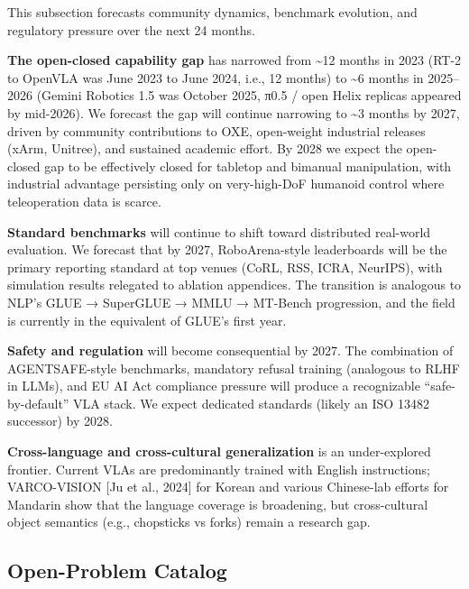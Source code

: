 \documentclass{article}
\begin{document}
This subsection forecasts community dynamics, benchmark evolution, and regulatory pressure over the next 24 months.

\textbf{The open-closed capability gap} has narrowed from \textasciitilde12 months in 2023 (RT-2 to OpenVLA was June 2023 to June 2024, i.e., 12 months) to \textasciitilde6 months in 2025--2026 (Gemini Robotics 1.5 was October 2025, π0.5 / open Helix replicas appeared by mid-2026). We forecast the gap will continue narrowing to \textasciitilde3 months by 2027, driven by community contributions to OXE, open-weight industrial releases (xArm, Unitree), and sustained academic effort. By 2028 we expect the open-closed gap to be effectively closed for tabletop and bimanual manipulation, with industrial advantage persisting only on very-high-DoF humanoid control where teleoperation data is scarce.

\textbf{Standard benchmarks} will continue to shift toward distributed real-world evaluation. We forecast that by 2027, RoboArena-style leaderboards will be the primary reporting standard at top venues (CoRL, RSS, ICRA, NeurIPS), with simulation results relegated to ablation appendices. The transition is analogous to NLP's GLUE → SuperGLUE → MMLU → MT-Bench progression, and the field is currently in the equivalent of GLUE's first year.

\textbf{Safety and regulation} will become consequential by 2027. The combination of AGENTSAFE-style benchmarks, mandatory refusal training (analogous to RLHF in LLMs), and EU AI Act compliance pressure will produce a recognizable ``safe-by-default'' VLA stack. We expect dedicated standards (likely an ISO 13482 successor) by 2028.

\textbf{Cross-language and cross-cultural generalization} is an under-explored frontier. Current VLAs are predominantly trained with English instructions; VARCO-VISION {[}Ju et al., 2024{]} for Korean and various Chinese-lab efforts for Mandarin show that the language coverage is broadening, but cross-cultural object semantics (e.g., chopsticks vs forks) remain a research gap.

\subsection{Open-Problem Catalog}\label{open-problem-catalog}
\end{document}
